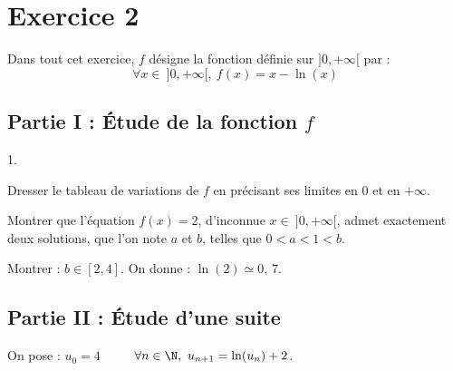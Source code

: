 

\section*{Exercice 2}

\noindent
Dans tout cet exercice, $f$ désigne la fonction définie sur $]0, + 
\infty[$ par :
\[
  \forall x \in \ ]0,+\infty[, \ f(x) = x - \ln(x)
\]

\subsection*{Partie I : Étude de la fonction $f$}

\begin{noliste}{1.}
  \setlength{\itemsep}{4mm}
  \item Dresser le tableau de variations de $f$ en précisant ses 
  limites en $0$ et en $+\infty$.
  
  
  
  \item Montrer que l'équation $f(x)=2$, d'inconnue $x \in \ 
  ]0,+\infty[$, admet exactement deux solutions, que l'on note $a$ et 
  $b$, telles que $0<a<1<b$.
  
  

  
\item Montrer : $b \in [2,4]$. On donne : $\ln(2) \simeq 0, \, 7$.
  
  
\end{noliste}




\subsection*{Partie II : Étude d'une suite}

\noindent
On pose : $u_0=4$ \ \  \ \ $\forall n \in \N, \ u_{n+1} =
\ln(u_n) +2$.

